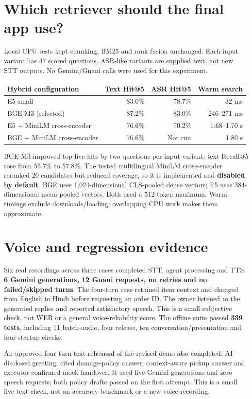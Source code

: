 \documentclass[10pt,a4paper]{article}
\begin{document}
\section{Which retriever should the final app use?}
Local CPU tests kept chunking, BM25 and rank fusion unchanged. Each input variant
has 47 scored questions. ASR-like variants are supplied text, not new STT outputs.
No Gemini/Gnani calls were used for this experiment.

{\small
\begin{tabularx}{\linewidth}{@{}Xrrr@{}}
\toprule
\rowcolor{mint}\textbf{Hybrid configuration} & \textbf{Text Hit@5} & \textbf{ASR Hit@5} & \textbf{Warm search}\\
\midrule
E5-small & 83.0\% & 78.7\% & 32 ms\\
\rowcolor{mint}BGE-M3 (selected) & 87.2\% & 83.0\% & 246--271 ms\\
E5 + MiniLM cross-encoder & 76.6\% & 70.2\% & 1.68--1.70 s\\
BGE + MiniLM cross-encoder & 76.6\% & Not run & 1.80 s\\
\bottomrule
\end{tabularx}}

BGE-M3 improved top-five hits by two questions per input variant; text Recall@5
rose from 55.7\% to 57.8\%. The tested multilingual MiniLM cross-encoder reranked
20 candidates but reduced coverage, so it is implemented and \textbf{disabled by
default}. BGE uses 1,024-dimensional CLS-pooled dense vectors; E5 uses
384-dimensional mean-pooled vectors. Both used a 512-token maximum.
Warm timings exclude downloads/loading; overlapping CPU work makes them approximate.

\section{Voice and regression evidence}
Six real recordings across three cases completed STT, agent processing and TTS:
\textbf{6 Gemini generations, 12 Gnani requests, no retries and no failed/skipped
turns}. The four-turn case retained item context and changed from English to
Hindi before requesting an order ID. The owner listened to the generated replies
and reported satisfactory speech. This is a small subjective check, not WER or a
general voice-reliability score. The offline suite passed \textbf{339 tests},
including 11 batch-audio, four release, ten conversation/presentation and four startup checks.

An approved four-turn text rehearsal of the revised demo also completed:
AI-disclosed greeting, cited damage-policy answer, context-aware pickup answer
and executor-confirmed mock handover. It used five Gemini generations and zero
speech requests; both policy drafts passed on the first attempt. This is a small
live text check, not an accuracy benchmark or a new voice recording.
\end{document}
